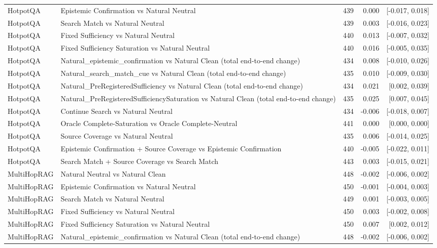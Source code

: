 \begin{table}[t]
\begin{tabular}{llrrr}
HotpotQA & Epistemic Confirmation vs Natural Neutral & 439 & 0.000 & [-0.017, 0.018] \\
HotpotQA & Search Match vs Natural Neutral & 439 & 0.003 & [-0.016, 0.023] \\
HotpotQA & Fixed Sufficiency vs Natural Neutral & 440 & 0.013 & [-0.007, 0.032] \\
HotpotQA & Fixed Sufficiency Saturation vs Natural Neutral & 440 & 0.016 & [-0.005, 0.035] \\
HotpotQA & Natural\_epistemic\_confirmation vs Natural Clean (total end-to-end change) & 434 & 0.008 & [-0.010, 0.026] \\
HotpotQA & Natural\_search\_match\_cue vs Natural Clean (total end-to-end change) & 435 & 0.010 & [-0.009, 0.030] \\
HotpotQA & Natural\_PreRegisteredSufficiency vs Natural Clean (total end-to-end change) & 434 & 0.021 & [0.002, 0.039] \\
HotpotQA & Natural\_PreRegisteredSufficiencySaturation vs Natural Clean (total end-to-end change) & 435 & 0.025 & [0.007, 0.045] \\
HotpotQA & Continue Search vs Natural Neutral & 434 & -0.006 & [-0.018, 0.007] \\
HotpotQA & Oracle Complete-Saturation vs Oracle Complete-Neutral & 441 & 0.000 & [0.000, 0.000] \\
HotpotQA & Source Coverage vs Natural Neutral & 435 & 0.006 & [-0.014, 0.025] \\
HotpotQA & Epistemic Confirmation + Source Coverage vs Epistemic Confirmation & 440 & -0.005 & [-0.022, 0.011] \\
HotpotQA & Search Match + Source Coverage vs Search Match & 443 & 0.003 & [-0.015, 0.021] \\
MultiHopRAG & Natural Neutral vs Natural Clean & 448 & -0.002 & [-0.006, 0.002] \\
MultiHopRAG & Epistemic Confirmation vs Natural Neutral & 450 & -0.001 & [-0.004, 0.003] \\
MultiHopRAG & Search Match vs Natural Neutral & 449 & 0.001 & [-0.003, 0.005] \\
MultiHopRAG & Fixed Sufficiency vs Natural Neutral & 450 & 0.003 & [-0.002, 0.008] \\
MultiHopRAG & Fixed Sufficiency Saturation vs Natural Neutral & 450 & 0.007 & [0.002, 0.012] \\
MultiHopRAG & Natural\_epistemic\_confirmation vs Natural Clean (total end-to-end change) & 448 & -0.002 & [-0.006, 0.002] \\

\end{tabular}
\end{table}

